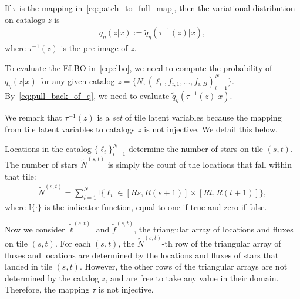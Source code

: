 If $\tau$ is the mapping in~\eqref{eq:patch_to_full_map}, then the variational distribution on catalogs $z$ is
\begin{align}
    q_\eta(z | x) := \tilde q_\eta(\tau^{-1}(z) | x),
    \label{eq:pull_back_of_q}
\end{align}
where $\tau^{-1}(z)$ is the pre-image of $z$.



\noindent To evaluate
the ELBO in~\eqref{eq:elbo}, 
we need to compute the probability of 
$q_\eta(z | x)$
for any given catalog $z = \{N, (\ell_i, f_{i,1}, ..., f_{i,B})_{i = 1}^N\}$. By~\eqref{eq:pull_back_of_q}, 
we need to evaluate $\tilde q_\eta(\tau^{-1}(z) | x)$. 

We remark that $\tau^{-1}(z)$ is a {\itshape set} of tile latent variables because the mapping from tile latent variables to catalogs $z$ is not injective. We detail this below. 

Locations in the catalog $\{\ell_i\}_{i=1}^N$
determine the number of stars on tile $(s,t)$. 
The number of stars $\tilde N^{(s,t)}$ is simply the count of the locations that fall within that tile:
\begin{align}
\tilde N^{(s,t)} = \sum_{i=1}^N 
\mathbb{I}\Big\{\ell_i\in [Rs, R(s+1)] \times [Rt, R(t+1)]\Big\},
\end{align}
where $\mathbb{I}\{\cdot\}$ is the indicator function, equal to one if true and zero if false.

Now we consider $\tilde\ell^{(s, t)}$ and $\tilde f^{(s, t)}$, the triangular array of locations and fluxes on tile $(s,t)$. 
For each $(s,t)$, the $\tilde N^{(s,t)}$-th row 
of the triangular array of fluxes and locations are 
determined by the locations and fluxes of stars that landed in tile $(s,t)$. However, the other rows 
of the triangular arrays are not determined by 
the catalog $z$, and are free to take any value in their domain. Therefore, the mapping $\tau$ is not injective. 

